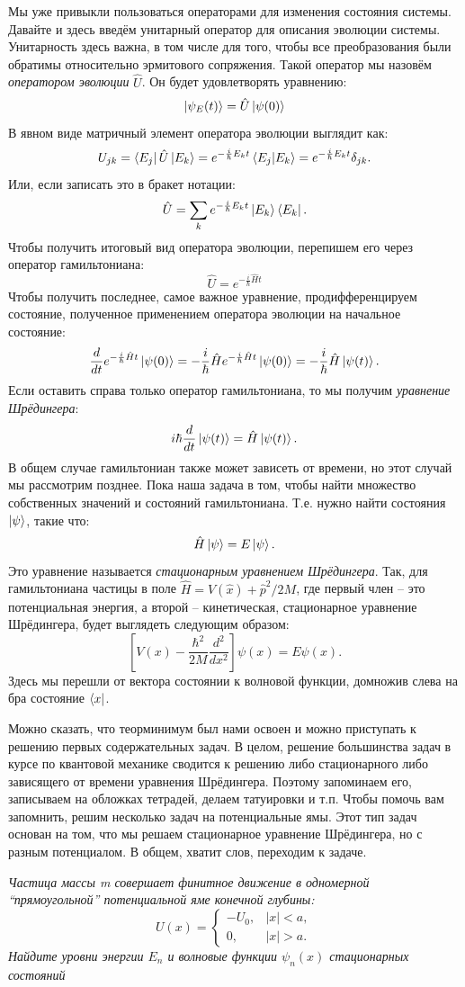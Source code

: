 Мы уже привыкли пользоваться операторами для изменения состояния системы. Давайте и здесь введём унитарный оператор для описания эволюции системы. Унитарность здесь важна, в том числе для того, чтобы все преобразования были обратимы относительно эрмитового сопряжения. Такой оператор мы назовём \textit{оператором эволюции} $\hat{U}$. Он будет удовлетворять уравнению:
\[
\ket{\psi_E(t)} = \hat{U} \ket{\psi(0)}
\]
В явном виде матричный элемент оператора эволюции выглядит как:
\[
U_{jk} = \bra{E_j} \hat{U} \ket{E_k} = e^{-\frac{i}{\hbar}E_k t} \bra{E_j} \ket{E_k} = e^{-\frac{i}{\hbar} E_k t}\delta_{jk}.
\]
Или, если записать это в бракет нотации:
\[
\hat{U} = \sum_{k} e^{-\frac{i}{\hbar} E_k t} \ket{E_k} \bra{E_k}.
\]
Чтобы получить итоговый вид оператора эволюции, перепишем его через оператор гамильтониана: 
\[
\hat{U} = e^{-\frac{i}{\hbar} \hat{H} t}
\]
Чтобы получить последнее, самое важное уравнение, продифференцируем состояние, полученное применением оператора эволюции на начальное состояние:
\[
\frac{d}{dt} e^{-\frac{i}{\hbar} \hat{H} t} \ket{\psi(0)} = -\frac{i}{\hbar} \hat{H} e^{-\frac{i}{\hbar} \hat{H} t} \ket{\psi(0)} = -\frac{i}{\hbar} \hat{H} \ket{\psi(t)}.
\]
Если оставить справа только оператор гамильтониана, то мы получим \textit{уравнение Шрёдингера}:
\[
i \hbar \frac{d}{dt} \ket{\psi(t)} = \hat{H} \ket{\psi(t)}.
\]
В общем случае гамильтониан также может зависеть от времени, но этот случай мы рассмотрим позднее. Пока наша задача в том, чтобы найти множество собственных значений и состояний гамильтониана. Т.е. нужно найти состояния $\ket{\psi}$, такие что:
\[
\hat{H} \ket{\psi} = E \ket{\psi}.
\]
Это уравнение называется \textit{стационарным уравнением Шрёдингера}. Так, для гамильтониана частицы в поле $\hat{H} = V(\hat{x}) + \hat{p}^2 / 2M$, где первый член -- это потенциальная энергия, а второй -- кинетическая, стационарное уравнение Шрёдингера, будет выглядеть следующим образом:
\[
\left[V(x) - \frac{\hbar^2}{2M} \frac{d^2}{dx^2}\right] \psi(x) = E \psi(x).
\]
Здесь мы перешли от вектора состоянии к волновой функции, домножив слева на бра состояние $\bra{x}$.

Можно сказать, что теорминимум был нами освоен и можно приступать к решению первых содержательных задач. В целом, решение большинства задач в курсе по квантовой механике сводится к решению либо стационарного либо зависящего от времени уравнения Шрёдингера. Поэтому запоминаем его, записываем на обложках тетрадей, делаем татуировки и т.п. Чтобы помочь вам запомнить, решим несколько задач на потенциальные ямы. Этот тип задач основан на том, что мы решаем стационарное уравнение Шрёдингера, но с разным потенциалом. В общем, хватит слов, переходим к задаче.
\begin{center}
    \textit{Частица массы m совершает финитное движение в одномерной ``прямоугольной'' потенциальной яме конечной глубины:}
    \[
    U(x) = 
    \begin{cases}
    -U_0,& |x| < a,\\
    0, & |x| > a.
    \end{cases}
    \]
    \textit{Найдите уровни энергии $E_n$ и волновые функции $\psi_n(x)$ стационарных состояний}
\end{center}

